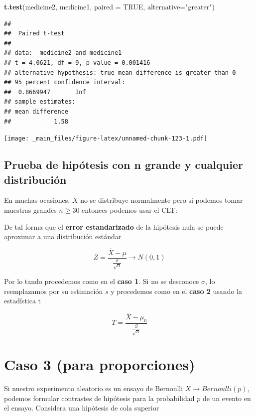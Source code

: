 \documentclass[
]{book}
\newenvironment{Shaded}{\begin{snugshade}}{\end{snugshade}}
\newcommand{\AttributeTok}[1]{\textcolor[rgb]{0.13,0.29,0.53}{#1}}
\newcommand{\ConstantTok}[1]{\textcolor[rgb]{0.56,0.35,0.01}{#1}}
\newcommand{\FunctionTok}[1]{\textcolor[rgb]{0.13,0.29,0.53}{\textbf{#1}}}
\newcommand{\NormalTok}[1]{#1}
\newcommand{\StringTok}[1]{\textcolor[rgb]{0.31,0.60,0.02}{#1}}
\begin{document}
\begin{Shaded}
\begin{Highlighting}[]
\FunctionTok{t.test}\NormalTok{(medicine2, medicine1,}
       \AttributeTok{paired =} \ConstantTok{TRUE}\NormalTok{,}
       \AttributeTok{alternative=}\StringTok{"greater"}\NormalTok{)}
\end{Highlighting}
\end{Shaded}

\begin{verbatim}
## 
##  Paired t-test
## 
## data:  medicine2 and medicine1
## t = 4.0621, df = 9, p-value = 0.001416
## alternative hypothesis: true mean difference is greater than 0
## 95 percent confidence interval:
##  0.8669947       Inf
## sample estimates:
## mean difference 
##            1.58
\end{verbatim}

\texttt{[image: \_main\_files/figure-latex/unnamed-chunk-123-1.pdf]}

\hypertarget{prueba-de-hipuxf3tesis-con-n-grande-y-cualquier-distribuciuxf3n}{%
\subsection{Prueba de hipótesis con n grande y cualquier distribución}\label{prueba-de-hipuxf3tesis-con-n-grande-y-cualquier-distribuciuxf3n}}

En muchas ocasiones, \(X\) no se distribuye normalmente pero si podemos tomar muestras grandes \(n \ge 30\) entonces podemos usar el CLT:

De tal forma que el \textbf{error estandarizado} de la hipótesis nula se puede aproximar a una distribución estándar

\[Z=\frac{\bar{X}-\mu}{\frac{\sigma}{\sqrt{n}}} \rightarrow N(0,1)\]

Por lo tando procedemos como en el \textbf{caso 1}. Si no se desconoce \(\sigma\), lo reemplazamos por su estimación \(s\) y procedemos como en el \textbf{caso 2} usando la estadística t

\[T=\frac{\bar{X}-\mu_0}{\frac{S}{\sqrt{n}}}\]

\hypertarget{caso-3-para-proporciones}{%
\section{Caso 3 (para proporciones)}\label{caso-3-para-proporciones}}

Si nuestro experimento aleatorio es un ensayo de Bernoulli \(X \rightarrow Bernoulli(p)\), podemos formular contrastes de hipótesis para la probabilidad \(p\) de un evento en el ensayo. Considera una hipótesis de cola superior
\end{document}
